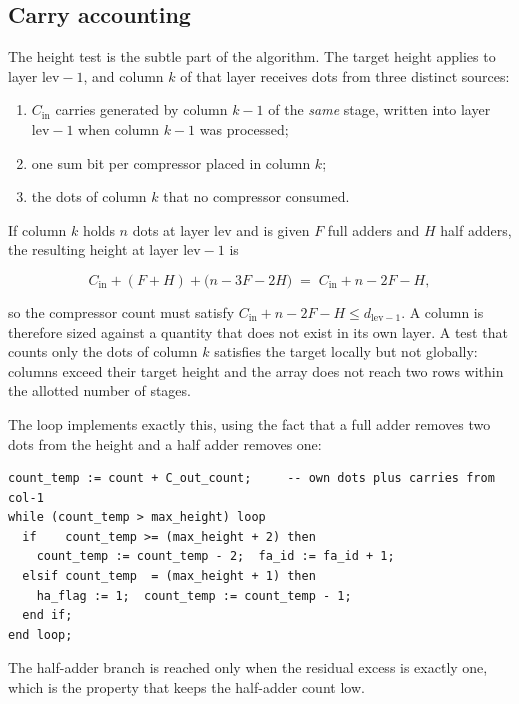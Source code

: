 \documentclass[11pt,a4paper]{article}
\begin{document}
\subsection{Carry accounting}

The height test is the subtle part of the algorithm. The target height applies
to layer $\mathrm{lev}-1$, and column $k$ of that layer receives dots from three
distinct sources:

\begin{enumerate}\itemsep1pt
\item $C_{\mathrm{in}}$ carries generated by column $k-1$ of the \emph{same}
      stage, written into layer $\mathrm{lev}-1$ when column $k-1$ was
      processed;
\item one sum bit per compressor placed in column $k$;
\item the dots of column $k$ that no compressor consumed.
\end{enumerate}

If column $k$ holds $n$ dots at layer $\mathrm{lev}$ and is given $F$ full
adders and $H$ half adders, the resulting height at layer $\mathrm{lev}-1$ is

\begin{equation}
C_{\mathrm{in}} + (F+H) + \bigl(n - 3F - 2H\bigr)
\;=\; C_{\mathrm{in}} + n - 2F - H,
\end{equation}

so the compressor count must satisfy
$C_{\mathrm{in}} + n - 2F - H \leq d_{\mathrm{lev}-1}$. A column is therefore
sized against a quantity that does not exist in its own layer. A test that
counts only the dots of column $k$ satisfies the target locally but not
globally: columns exceed their target height and the array does not reach two
rows within the allotted number of stages.

The loop implements exactly this, using the fact that a full adder removes two
dots from the height and a half adder removes one:

\begin{lstlisting}[style=vhdl]
count_temp := count + C_out_count;     -- own dots plus carries from col-1
while (count_temp > max_height) loop
  if    count_temp >= (max_height + 2) then
    count_temp := count_temp - 2;  fa_id := fa_id + 1;
  elsif count_temp  = (max_height + 1) then
    ha_flag := 1;  count_temp := count_temp - 1;
  end if;
end loop;
\end{lstlisting}

The half-adder branch is reached only when the residual excess is exactly one,
which is the property that keeps the half-adder count low.
\end{document}
